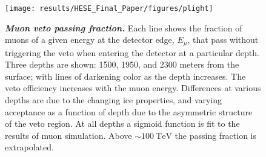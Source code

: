 \begin{figure}
	\centering
	\texttt{[image: results/HESE\_Final\_Paper/figures/plight]}
	\internallinenumbers
	\caption{\textbf{\textit{Muon veto passing fraction.}} Each line shows the fraction of muons of a given energy at the detector edge, $E_\mu$, that pass without triggering the veto when entering the detector at a particular depth.
		Three depths are shown: 1500, 1950, and 2300 meters from the surface; with lines of darkening color as the depth increases.
		The veto efficiency increases with the muon energy.
		Differences at various depths are due to the changing ice properties, and varying acceptance as a function of depth due to the asymmetric structure of the veto region.
		At all depths a sigmoid function is fit to the results of muon simulation.
		Above $\sim\SI{100}\TeV$ the passing fraction is extrapolated.}\label{fig:P_light}
\end{figure}

